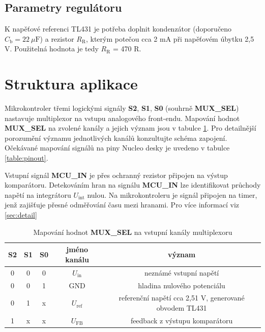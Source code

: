 \documentclass[twoside]{article}
\begin{document}
\subsection{Parametry regulátoru}

K napěťové referenci TL431 je potřeba doplnit kondenzátor (doporučeno $C_\text{b} = 22~\mu \text{F}$) a rezistor $R_\text{R}$, kterým
potečou cca 2 mA při napěťovém úbytku 2,5 V. Použitelná hodnota je tedy $R_\text{R}$ = 470 R.

\section{Struktura aplikace}

Mikrokontroler třemi logickými signály \textbf{S2}, \textbf{S1}, \textbf{S0} (souhrně \textbf{MUX\_SEL}) nastavuje
multiplexor na vstupu analogového front-endu. Mapování hodnot \textbf{MUX\_SEL} na zvolené kanály
a jejich význam jsou v tabulce \ref{table:mux}. Pro detailnější porozumění významu jednotlivých kanálů
konzultujte schéma zapojení. Očekávané mapování signálů na piny Nucleo desky je uvedeno v tabulce \ref{table:pinout}.

Vstupní signál \textbf{MCU\_IN} je přes ochranný rezistor připojen na výstup komparátoru.
Detekováním hran na signálu \textbf{MCU\_IN} lze identifikovat průchody napětí na integrátoru $U_{\text{int}}$ nulou.
Na mikrokontroleru je signál připojen na timer, jenž zajišťuje přesné odměřování času mezi hranami.
Pro více informací viz \ref{sec:detail}

\begin{table}[htbp]
    \centering
    \begin{tabular}{c|c|c|c|c}
        \textbf{S2} & \textbf{S1} & \textbf{S0} & \textbf{jméno kanálu} & \textbf{význam}\\ \hline
        0 & 0 & 0 & $U_{\text{in}}$ & neznámé vstupní napětí \\
        0 & 0 & 1 & GND & hladina nulového potenciálu \\
        0 & 1 & x & $U_{\text{ref}}$ & referenční napětí cca 2,51 V, generované obvodem TL431\\
        1 & x & x & $U_{\text{FB}}$ & feedback z výstupu komparátoru
    \end{tabular}
    \caption{Mapování hodnot \textbf{MUX\_SEL} na vstupní kanály multiplexoru}
    \label{table:mux}
\end{table}
\end{document}

